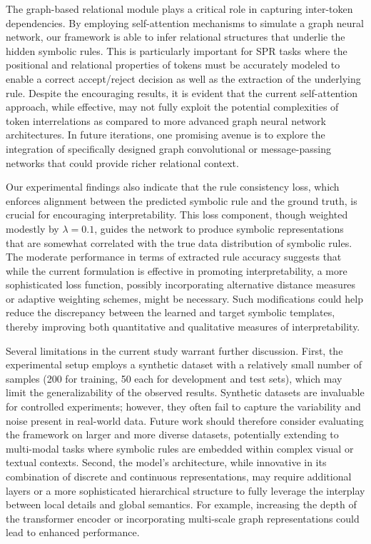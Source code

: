 \documentclass{article}
\begin{document}
The graph-based relational module plays a critical role in capturing inter-token dependencies. By employing self-attention mechanisms to simulate a graph neural network, our framework is able to infer relational structures that underlie the hidden symbolic rules. This is particularly important for SPR tasks where the positional and relational properties of tokens must be accurately modeled to enable a correct accept/reject decision as well as the extraction of the underlying rule. Despite the encouraging results, it is evident that the current self-attention approach, while effective, may not fully exploit the potential complexities of token interrelations as compared to more advanced graph neural network architectures. In future iterations, one promising avenue is to explore the integration of specifically designed graph convolutional or message-passing networks that could provide richer relational context.

Our experimental findings also indicate that the rule consistency loss, which enforces alignment between the predicted symbolic rule and the ground truth, is crucial for encouraging interpretability. This loss component, though weighted modestly by \(\lambda = 0.1\), guides the network to produce symbolic representations that are somewhat correlated with the true data distribution of symbolic rules. The moderate performance in terms of extracted rule accuracy suggests that while the current formulation is effective in promoting interpretability, a more sophisticated loss function, possibly incorporating alternative distance measures or adaptive weighting schemes, might be necessary. Such modifications could help reduce the discrepancy between the learned and target symbolic templates, thereby improving both quantitative and qualitative measures of interpretability.

Several limitations in the current study warrant further discussion. First, the experimental setup employs a synthetic dataset with a relatively small number of samples (200 for training, 50 each for development and test sets), which may limit the generalizability of the observed results. Synthetic datasets are invaluable for controlled experiments; however, they often fail to capture the variability and noise present in real-world data. Future work should therefore consider evaluating the framework on larger and more diverse datasets, potentially extending to multi-modal tasks where symbolic rules are embedded within complex visual or textual contexts. Second, the model’s architecture, while innovative in its combination of discrete and continuous representations, may require additional layers or a more sophisticated hierarchical structure to fully leverage the interplay between local details and global semantics. For example, increasing the depth of the transformer encoder or incorporating multi-scale graph representations could lead to enhanced performance.
\end{document}
